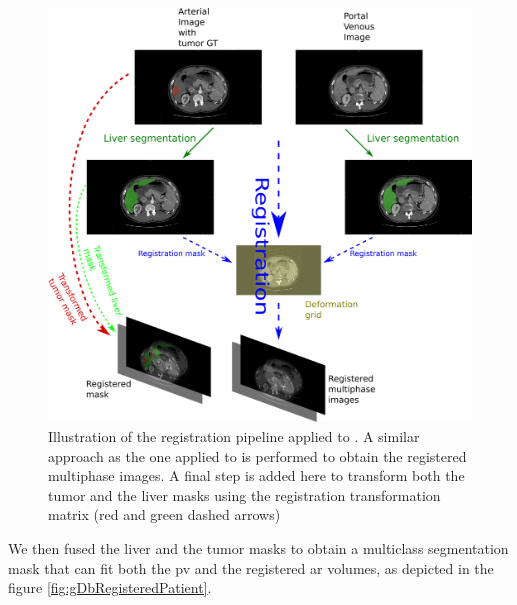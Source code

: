 \begin{figure}[th!]
\centering
\includegraphics[width=0.9\linewidth]{../HistologicalGradePrediction/images/GDB/GDB_registration_pipeline_vertical}
\caption{Illustration of the registration pipeline applied to \textbf{}. A similar approach as the one applied to \textbf{} is performed to obtain the registered multiphase images. A final step is added here to transform both the tumor and the liver masks using the registration transformation matrix (red and green dashed arrows)}
\label{fig:GDB_registration_pipeline_vertical}
\end{figure}

We then fused the liver and the tumor masks to obtain a multiclass
segmentation mask that can fit both the \ac{pv} and the registered \ac{ar} volumes, as depicted in the figure \ref{fig:gDbRegisteredPatient}.

